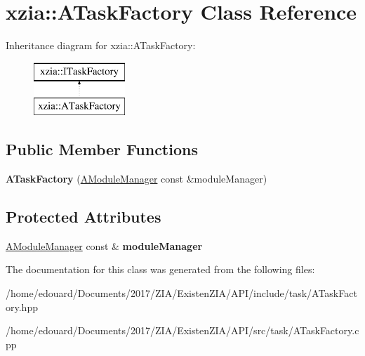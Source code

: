 \hypertarget{classxzia_1_1ATaskFactory}{}\section{xzia\+:\+:A\+Task\+Factory Class Reference}
\label{classxzia_1_1ATaskFactory}
Inheritance diagram for xzia\+:\+:A\+Task\+Factory\+:\begin{figure}[H]
\begin{center}
\leavevmode
\includegraphics[height=2.000000cm]{classxzia_1_1ATaskFactory}
\end{center}
\end{figure}
\subsection*{Public Member Functions}
\begin{DoxyCompactItemize}
\item 
\mbox{\label{classxzia_1_1ATaskFactory_a0c44c3f9e859ff8b297a31a3d240b20b}} 
{\bfseries A\+Task\+Factory} (\mbox{\hyperlink{classxzia_1_1AModuleManager}{A\+Module\+Manager}} const \&module\+Manager)
\end{DoxyCompactItemize}
\subsection*{Protected Attributes}
\begin{DoxyCompactItemize}
\item 
\mbox{\label{classxzia_1_1ATaskFactory_a5746d8b145c2911231bc13c88b7484c4}} 
\mbox{\hyperlink{classxzia_1_1AModuleManager}{A\+Module\+Manager}} const  \& {\bfseries module\+Manager}
\end{DoxyCompactItemize}


The documentation for this class was generated from the following files\+:\begin{DoxyCompactItemize}
\item 
/home/edouard/\+Documents/2017/\+Z\+I\+A/\+Existen\+Z\+I\+A/\+A\+P\+I/include/task/A\+Task\+Factory.\+hpp\item 
/home/edouard/\+Documents/2017/\+Z\+I\+A/\+Existen\+Z\+I\+A/\+A\+P\+I/src/task/A\+Task\+Factory.\+cpp\end{DoxyCompactItemize}

